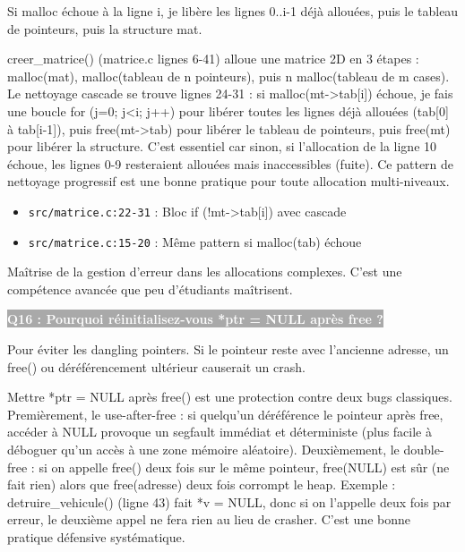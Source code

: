 \documentclass[12pt,a4paper]{article}
\newcommand{\question}[1]{%
    \vspace{0.5cm}
    \noindent\colorbox{darkgray}{\textcolor{white}{\textbf{#1}}}
    \vspace{0.3cm}
}
\begin{document}
\begin{reponse_courte}
Si malloc échoue à la ligne i, je libère les lignes 0..i-1 déjà allouées, puis le tableau de pointeurs, puis la structure mat.
\end{reponse_courte}

\begin{reponse_longue}
creer\_matrice() (matrice.c lignes 6-41) alloue une matrice 2D en 3 étapes : malloc(mat), malloc(tableau de n pointeurs), puis n malloc(tableau de m cases). Le nettoyage cascade se trouve lignes 24-31 : si malloc(mt->tab[i]) échoue, je fais une boucle for (j=0; j<i; j++) pour libérer toutes les lignes déjà allouées (tab[0] à tab[i-1]), puis free(mt->tab) pour libérer le tableau de pointeurs, puis free(mt) pour libérer la structure. C'est essentiel car sinon, si l'allocation de la ligne 10 échoue, les lignes 0-9 resteraient allouées mais inaccessibles (fuite). Ce pattern de nettoyage progressif est une bonne pratique pour toute allocation multi-niveaux.
\end{reponse_longue}

\begin{reference_code}
\begin{itemize}
    \item \texttt{src/matrice.c:22-31} : Bloc if (!mt->tab[i]) avec cascade
    \item \texttt{src/matrice.c:15-20} : Même pattern si malloc(tab) échoue
\end{itemize}
\end{reference_code}

\begin{objectif_prof}
Maîtrise de la gestion d'erreur dans les allocations complexes. C'est une compétence avancée que peu d'étudiants maîtrisent.
\end{objectif_prof}

\question{Q16 : Pourquoi réinitialisez-vous *ptr = NULL après free ?}

\begin{reponse_courte}
Pour éviter les dangling pointers. Si le pointeur reste avec l'ancienne adresse, un free() ou déréférencement ultérieur causerait un crash.
\end{reponse_courte}

\begin{reponse_longue}
Mettre *ptr = NULL après free() est une protection contre deux bugs classiques. Premièrement, le use-after-free : si quelqu'un déréférence le pointeur après free, accéder à NULL provoque un segfault immédiat et déterministe (plus facile à déboguer qu'un accès à une zone mémoire aléatoire). Deuxièmement, le double-free : si on appelle free() deux fois sur le même pointeur, free(NULL) est sûr (ne fait rien) alors que free(adresse) deux fois corrompt le heap. Exemple : detruire\_vehicule() (ligne 43) fait *v = NULL, donc si on l'appelle deux fois par erreur, le deuxième appel ne fera rien au lieu de crasher. C'est une bonne pratique défensive systématique.
\end{reponse_longue}
\end{document}
